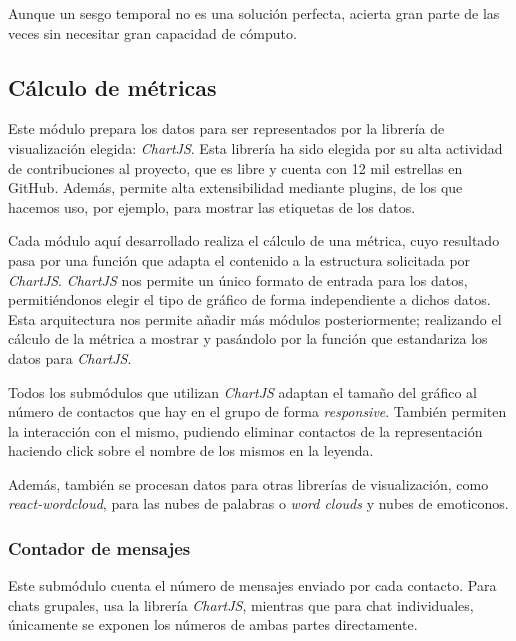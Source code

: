 Aunque un sesgo temporal no es una solución perfecta, acierta gran parte de las veces sin necesitar gran capacidad de cómputo.

\subsection{Cálculo de métricas}

Este módulo prepara los datos para ser representados por la librería de visualización elegida: \textit{ChartJS}.  Esta librería ha sido elegida por su alta actividad de contribuciones al proyecto, que es libre y cuenta con 12 mil estrellas en GitHub. Además, permite alta extensibilidad mediante plugins, de los que hacemos uso, por ejemplo, para mostrar las etiquetas de los datos.

Cada módulo aquí desarrollado realiza el cálculo de una métrica, cuyo resultado pasa por una función que adapta el contenido a la estructura solicitada por \textit{ChartJS}. \textit{ChartJS} nos permite un único formato de entrada para los datos, permitiéndonos elegir el tipo de gráfico de forma independiente a dichos datos. Esta arquitectura nos permite añadir más módulos posteriormente; realizando el cálculo de la métrica a mostrar y pasándolo por la función que estandariza los datos para \textit{ChartJS}.

Todos los submódulos que utilizan \textit{ChartJS} adaptan el tamaño del gráfico al número de contactos que hay en el grupo de forma \textit{responsive}. También permiten la interacción con el mismo, pudiendo eliminar contactos de la representación haciendo click sobre el nombre de los mismos en la leyenda.

Además, también se procesan datos para otras librerías de visualización, como \textit{react-wordcloud}, para las nubes de palabras o \textit{word clouds} y nubes de emoticonos.

\subsubsection{Contador de mensajes}

Este submódulo cuenta el número de mensajes enviado por cada contacto. Para chats grupales, usa la librería \textit{ChartJS}, mientras que para chat individuales, únicamente se exponen los números de ambas partes directamente.


